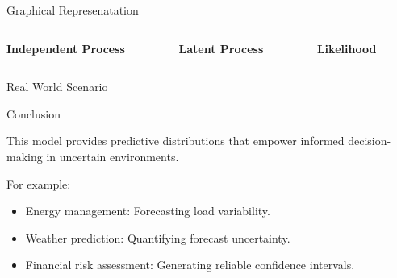 \documentclass[spanish, aspectratio=169]{beamer}
\begin{document}
\begin{frame}{Graphical Represenatation}
\begin{tikzpicture}[x=4.2cm,y=1.7cm]
\end{tikzpicture}
\scriptsize
\begin{columns}[T] %
	\begin{column}{0.33\textwidth}
		\centering	
		\textcolor{mygreen}{
			\textbf{Independent Process}
			\vspace{-1.3em}
		}
	\end{column}
	
	\begin{column}{0.33\textwidth}
		\centering
		\textcolor{myblue}{
			\textbf{Latent Process}
			\vspace{-1.3em}
		}
	\end{column}
	
	\begin{column}{0.33\textwidth}
		\centering
		\textcolor{myred}{
			\textbf{Likelihood}
			\vspace{-1.3em}
		}
	\end{column}
	
\end{columns}
\end{frame}

\begin{frame}{Real World Scenario}
	\centering
	
\end{frame}

\begin{frame}{Conclusion}
	\begin{block}{}
	This model provides predictive distributions that empower informed decision-making in uncertain environments.
	
	For example:
	\begin{itemize}
		\item Energy management: Forecasting load variability.
		\item Weather prediction: Quantifying forecast uncertainty.
		\item Financial risk assessment: Generating reliable confidence intervals.
	\end{itemize}
	\end{block}
\end{frame}
\end{document}
